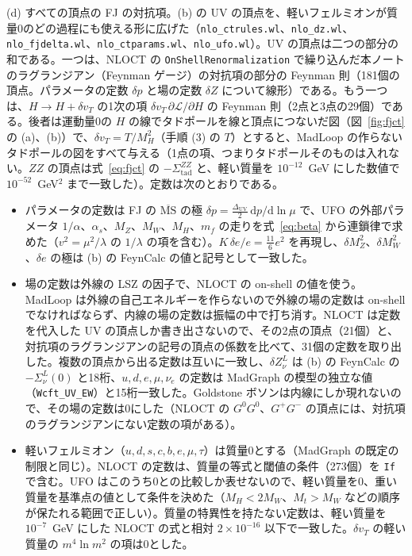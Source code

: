 \documentclass[a4paper,10pt]{ltjsarticle}
\newcommand{\dd}{\mathrm{d}}
\newcommand{\MSbar}{\overline{\mathrm{MS}}}
\newcommand{\DUV}{\Delta_{\mathrm{UV}}}
\begin{document}
(d) すべての頂点の FJ の対抗項。(b) の UV の頂点を、軽いフェルミオンが質量0のどの過程にも使える形に広げた（\texttt{nlo\_ctrules.wl}、\texttt{nlo\_dz.wl}、\texttt{nlo\_fjdelta.wl}、\texttt{nlo\_ctparams.wl}、\texttt{nlo\_ufo.wl}）。UV の頂点は二つの部分の和である。一つは、NLOCT の \texttt{OnShellRenormalization} で繰り込んだ本ノートのラグランジアン（Feynman ゲージ）の対抗項の部分の Feynman 則（181個の頂点。パラメータの定数 $\delta p$ と場の定数 $\delta Z$ について線形）である。もう一つは、$H\to H+\delta v_T$ の1次の項 $\delta v_T\,\partial\mathcal L/\partial H$ の Feynman 則（2点と3点の29個）である。後者は運動量0の $H$ の線でタドポールを線と頂点につないだ図（図~\ref{fig:fjct} の (a)、(b)）で、$\delta v_T=T/M_H^2$（手順 (3) の $T$）とすると、MadLoop の作らないタドポールの図をすべて与える（1点の項、つまりタドポールそのものは入れない。$ZZ$ の頂点は式~\eqref{eq:fjct} の $-\Sigma^{ZZ}_{\mathrm{tad}}$ と、軽い質量を $10^{-12}$~GeV にした数値で $10^{-52}$~GeV$^2$ まで一致した）。定数は次のとおりである。
\begin{itemize}
\item パラメータの定数は FJ の $\MSbar$ の極 $\delta p=\frac{\DUV}2\,\dd p/\dd\ln\mu$ で、UFO の外部パラメータ $1/\alpha$、$\alpha_s$、$M_Z$、$M_W$、$M_H$、$m_f$ の走りを式~\eqref{eq:beta} から連鎖律で求めた（$v^2=\mu^2/\lambda$ の $1/\lambda$ の項を含む）。$K\,\delta e/e=\frac{11}6e^2$ を再現し、$\delta M_Z^2$、$\delta M_W^2$、$\delta e$ の極は (b) の FeynCalc の値と記号として一致した。
\item 場の定数は外線の LSZ の因子で、NLOCT の on-shell の値を使う。MadLoop は外線の自己エネルギーを作らないので外線の場の定数は on-shell でなければならず、内線の場の定数は振幅の中で打ち消す。NLOCT は定数を代入した UV の頂点しか書き出さないので、その2点の頂点（21個）と、対抗項のラグランジアンの記号の頂点の係数を比べて、31個の定数を取り出した。複数の頂点から出る定数は互いに一致し、$\delta Z^L_\nu$ は (b) の FeynCalc の $-\Sigma^L_\nu(0)$ と18桁、$u,d,e,\mu,\nu_e$ の定数は MadGraph の模型の独立な値（\texttt{Wcft\_UV\_EW}）と15桁一致した。Goldstone ボソンは内線にしか現れないので、その場の定数は0にした（NLOCT の $G^0G^0$、$G^+G^-$ の頂点には、対抗項のラグランジアンにない定数の項がある）。
\item 軽いフェルミオン（$u,d,s,c,b,e,\mu,\tau$）は質量0とする（MadGraph の既定の制限と同じ）。NLOCT の定数は、質量の等式と閾値の条件（273個）を \texttt{If} で含む。UFO はこのうち0との比較しか表せないので、軽い質量を0、重い質量を基準点の値として条件を決めた（$M_H<2M_W$、$M_t>M_W$ などの順序が保たれる範囲で正しい）。質量の特異性を持たない定数は、軽い質量を $10^{-7}$~GeV にした NLOCT の式と相対 $2\times10^{-16}$ 以下で一致した。$\delta v_T$ の軽い質量の $m^4\ln m^2$ の項は0とした。
\end{itemize}
\end{document}
